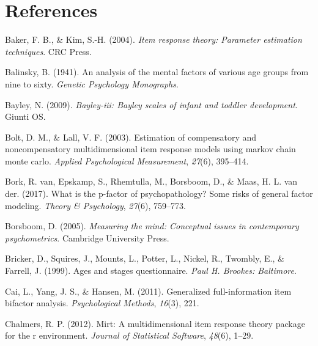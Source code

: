 \documentclass[10pt, letterpaper]{article}
\begin{document}
\hypertarget{references}{%
\section{References}\label{references}}

\setlength{\parindent}{-0.1in} 
\setlength{\leftskip}{0.125in}

\noindent

\hypertarget{refs}{}
\leavevmode\hypertarget{ref-baker2004item}{}%
Baker, F. B., \& Kim, S.-H. (2004). \emph{Item response theory:
Parameter estimation techniques}. CRC Press.

\leavevmode\hypertarget{ref-balinsky1941analysis}{}%
Balinsky, B. (1941). An analysis of the mental factors of various age
groups from nine to sixty. \emph{Genetic Psychology Monographs}.

\leavevmode\hypertarget{ref-bayley2009bayley}{}%
Bayley, N. (2009). \emph{Bayley-iii: Bayley scales of infant and toddler
development}. Giunti OS.

\leavevmode\hypertarget{ref-bolt2003estimation}{}%
Bolt, D. M., \& Lall, V. F. (2003). Estimation of compensatory and
noncompensatory multidimensional item response models using markov chain
monte carlo. \emph{Applied Psychological Measurement}, \emph{27}(6),
395--414.

\leavevmode\hypertarget{ref-van2017p}{}%
Bork, R. van, Epskamp, S., Rhemtulla, M., Borsboom, D., \& Maas, H. L.
van der. (2017). What is the p-factor of psychopathology? Some risks of
general factor modeling. \emph{Theory \& Psychology}, \emph{27}(6),
759--773.

\leavevmode\hypertarget{ref-borsboom2005measuring}{}%
Borsboom, D. (2005). \emph{Measuring the mind: Conceptual issues in
contemporary psychometrics}. Cambridge University Press.

\leavevmode\hypertarget{ref-bricker1999ages}{}%
Bricker, D., Squires, J., Mounts, L., Potter, L., Nickel, R., Twombly,
E., \& Farrell, J. (1999). Ages and stages questionnaire. \emph{Paul H.
Brookes: Baltimore}.

\leavevmode\hypertarget{ref-cai2011generalized}{}%
Cai, L., Yang, J. S., \& Hansen, M. (2011). Generalized full-information
item bifactor analysis. \emph{Psychological Methods}, \emph{16}(3), 221.

\leavevmode\hypertarget{ref-chalmers2012mirt}{}%
Chalmers, R. P. (2012). Mirt: A multidimensional item response theory
package for the r environment. \emph{Journal of Statistical Software},
\emph{48}(6), 1--29.
\end{document}
